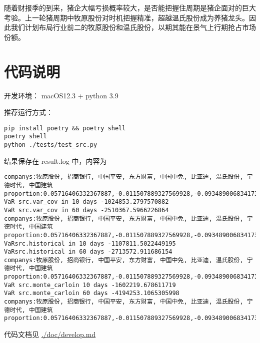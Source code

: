 \documentclass[a4paper,12pt]{ctexart}
\begin{document}
随着财报季的到来，猪企大幅亏损概率较大，是否能把握住周期是猪企面对的巨大考验。上一轮猪周期中牧原股份对时机把握精准，超越温氏股份成为养猪龙头。因此我们计划布局行业前二的牧原股份和温氏股份，以期其能在景气上行期抢占市场份额。
\section{代码说明}
\label{sec:orgad42289}
开发环境： macOS12.3 + python 3.9

推荐运行方式：
\begin{verbatim}
pip install poetry && poetry shell
poetry shell
python ./tests/test_src.py
\end{verbatim}
结果保存在 result.log 中，内容为

\begin{verbatim}
companys:牧原股份, 招商银行, 中国平安, 东方财富, 中国中免, 比亚迪, 温氏股份, 宁德时代, 中国建筑
proportion:0.05716406332367887,-0.011507889327569928,-0.09348900683417324,0.20134989514587248,0.040865422930575025,0.0861138840584174,0.3197216111374898,0.3572151189497322,0.04256690061597743
VaR src.var_cov in 10 days -1024853.2797570882
VaR src.var_cov in 60 days -2510367.5966226864
companys:牧原股份, 招商银行, 中国平安, 东方财富, 中国中免, 比亚迪, 温氏股份, 宁德时代, 中国建筑
proportion:0.05716406332367887,-0.011507889327569928,-0.09348900683417324,0.20134989514587248,0.040865422930575025,0.0861138840584174,0.3197216111374898,0.3572151189497322,0.04256690061597743
VaRsrc.historical in 10 days -1107811.5022449195
VaRsrc.historical in 60 days -2713572.911686154
companys:牧原股份, 招商银行, 中国平安, 东方财富, 中国中免, 比亚迪, 温氏股份, 宁德时代, 中国建筑
proportion:0.05716406332367887,-0.011507889327569928,-0.09348900683417324,0.20134989514587248,0.040865422930575025,0.0861138840584174,0.3197216111374898,0.3572151189497322,0.04256690061597743
VaR src.monte_carloin 10 days -1602219.678611719
VaR src.monte_carloin 60 days -4194253.1065305998
companys:牧原股份, 招商银行, 中国平安, 东方财富, 中国中免, 比亚迪, 温氏股份, 宁德时代, 中国建筑
proportion:0.05716406332367887,-0.011507889327569928,-0.09348900683417324,0.20134989514587248,0.040865422930575025,0.0861138840584174,0.3197216111374898,0.3572151189497322,0.04256690061597743
\end{verbatim}


代码文档见 \url{./doc/develop.md}
\end{document}
